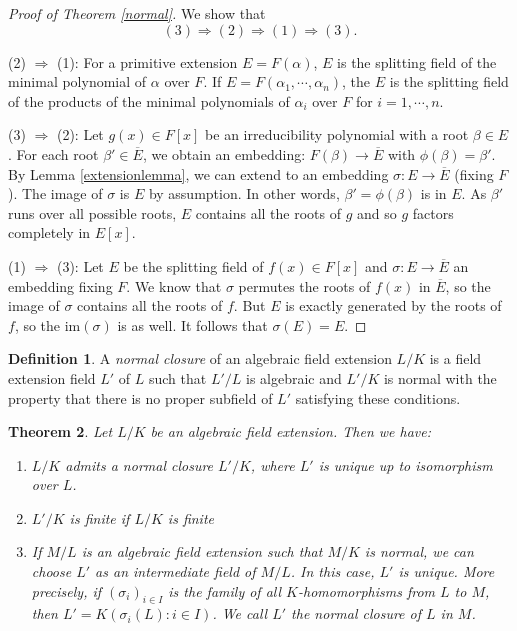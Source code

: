 \documentclass[12pt]{report}
\newtheorem{theorem}{Theorem}[section]
\theoremstyle{definition}
\newtheorem{definition}[theorem]{Definition}
\newcommand{\im}{\text{im}}
\begin{document}
\begin{proof}[Proof of Theorem \ref{normal}] We show that $$(3)\Longrightarrow(2)\Longrightarrow (1)\Longrightarrow (3).$$

	(2) $\Longrightarrow$ (1): For a primitive extension $E=F(\alpha)$, $E$ is the splitting field of the minimal polynomial of $\alpha$ over $F$. If $E=F(\alpha_1,\cdots,\alpha_n)$, the $E$ is the splitting field of the products of the minimal polynomials of $\alpha_i$ over $F$ for $i=1,\cdots,n$.

	(3) $\Longrightarrow$ (2): Let $g(x)\in F[x]$ be an irreducibility polynomial with a root $\beta\in E$. For each root $\beta'\in \overline{E}$, we obtain an embedding: $F(\beta) \to \overline{E}$ with $\phi(\beta)=\beta'$. By Lemma \ref{extensionlemma}, we can extend to an embedding $\sigma: E\to \overline{E}$ (fixing $F$). The image of $\sigma$ is $E$ by assumption. In other words, $\beta'=\phi(\beta)$ is in $E$. As $\beta'$ runs over all possible roots, $E$ contains all the roots of $g$ and so $g$ factors completely in $E[x]$.

	(1) $\Longrightarrow$ (3): Let $E$ be the splitting field of $f(x)\in F[x]$ and $\sigma: E\to\overline{E}$ an embedding fixing $F$. We know that $\sigma$ permutes the roots of $f(x)$ in $\overline{E}$, so the image of $\sigma$ contains all the roots of $f$. But $E$ is exactly generated by the roots of $f$, so the $\im(\sigma)$ is as well. It follows that $\sigma(E)=E$.
\end{proof}

\begin{definition}
	A \emph{normal closure} of an algebraic field extension $L/K$ is a field extension field $L'$ of $L$ such that $L'/L$ is algebraic and $L'/K$ is normal with the property that there is no proper subfield of $L'$ satisfying these conditions.
\end{definition}

\begin{theorem}\label{normalclosure}
	Let $L/K$ be an algebraic field extension. Then we have:
	\begin{enumerate}
		\item $L/K$ admits a normal closure $L'/K$, where $L'$ is unique up to isomorphism over $L$.
		\item $L'/K$ is finite if $L/K$ is finite
		\item If $M/L$ is an algebraic field extension such that $M/K$ is normal, we can choose $L'$ as an intermediate field of $M/L$. In this case, $L'$ is unique. More precisely, if $(\sigma_i)_{i\in I}$ is the family of all $K$-homomorphisms from $L$ to $M$, then $L' = K(\sigma_i(L): i \in I)$. We call $L'$ the normal closure of $L$ in $M$.
	\end{enumerate}
\end{theorem}
\end{document}
